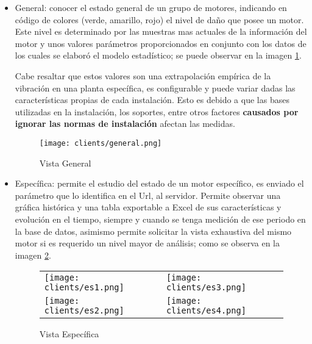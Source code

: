 \begin{itemize}
    \item General: conocer el estado general de un grupo de motores, indicando
        en código de colores (verde, amarillo, rojo) el nivel de daño que posee
        un motor. Este nivel es determinado por las muestras mas actuales de
        la información del motor y unos valores parámetros proporcionados en
        conjunto con los datos de los cuales se elaboró el modelo estadístico;
        se puede observar en la imagen \ref{img:VistaGeneral}.

        Cabe resaltar que estos valores son una extrapolación empírica de la
        vibración en una planta específica, es configurable y puede variar dadas
        las características propias de cada instalación. Esto es debido a que
        las bases utilizadas en la instalación, los soportes, entre otros factores
        \textbf{causados por ignorar las normas de instalación} afectan las medidas.

\begin{center}
    \begin{figure}[ht]
		\centering
        \caption{Vista General}
        \texttt{[image: clients/general.png]}
        \label{img:VistaGeneral}
	\end{figure}
\end{center}

        \vspace{-1.3cm}
    \item Específica:  permite el estudio del estado de un motor específico,
        es enviado el parámetro que lo identifica en el Url, al servidor.
        Permite observar
        una gráfica histórica y una tabla exportable a Excel de sus características y
        evolución en el tiempo, siempre y cuando se tenga medición de ese periodo
        en la base de datos, asimismo permite solicitar la vista exhaustiva del
        mismo motor si es requerido un nivel mayor de análisis;
        como se observa en la imagen \ref{img:VistaEspecifica}.

\begin{center}
    \begin{figure}[ht]
		\centering
        \caption{Vista Específica}
            \begin{tabular}{m{6cm}m{6cm}}
                \texttt{[image: clients/es1.png]}&
        \texttt{[image: clients/es3.png]}\\
                \texttt{[image: clients/es2.png]}&
        \texttt{[image: clients/es4.png]}
            \end{tabular}
        \label{img:VistaEspecifica}
	\end{figure}
\end{center}


\end{itemize}
